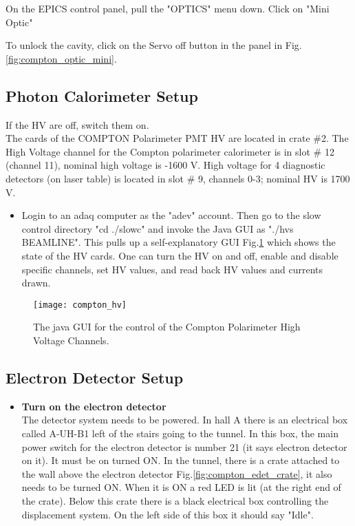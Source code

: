{\begin{itemize}
On the EPICS control panel, pull the "OPTICS" menu down. Click on "Mini Optic" 

To unlock the cavity, click on the Servo off button in the panel in Fig.\ref{fig:compton_optic_mini}.
\end{itemize}

\subsection{Photon Calorimeter Setup}

If the HV are off, switch them on.\\

The cards of the COMPTON Polarimeter PMT HV are located in crate \#2.
The High Voltage channel for the Compton polarimeter calorimeter is in slot \# 12 (channel 11), nominal
high voltage is -1600 V. High voltage for 4 diagnostic detectors (on laser table) is located in
slot \# 9, channels 0-3; nominal HV is 1700 V.


\begin{itemize}
\item Login to an adaq computer as the "adev" account.  Then go to
the slow control directory "cd ./slowc" and invoke the Java
GUI as "./hvs BEAMLINE".  This pulls up a self-explanatory
GUI Fig.\ref{fig:compton_hv} which shows the state of the HV cards.  One can turn
the HV on and off, enable and disable specific channels,
set HV values, and read back HV values and currents drawn.
\end{itemize}

 \begin{figure}[htp]
    \begin{center}
        \texttt{[image: compton\_hv]}
    \end{center}
    \caption[compton:electron hv]{
            The java GUI for  the control of the Compton Polarimeter High Voltage  Channels.}
    \label{fig:compton_hv}
 \end{figure}

\subsection{Electron Detector Setup}
\begin{itemize}
\item {\bf Turn on the electron detector}\\
        The detector system needs to be powered. In hall A there is an
        electrical box called A-UH-B1 left of the stairs going to the tunnel. 
        In this box, the main power switch for the electron detector is number 21 (it says electron
        detector on it). It must be on turned ON. In the tunnel,
        there is a crate attached to the wall above the electron detector Fig.\ref{fig:compton_edet_crate}, it also needs to be turned ON.
        When it is ON a red LED is lit (at the right end of the crate). Below this crate there is a black electrical
        box controlling the displacement system. On the left side of this box it should say "Idle".


\end{itemize}}
